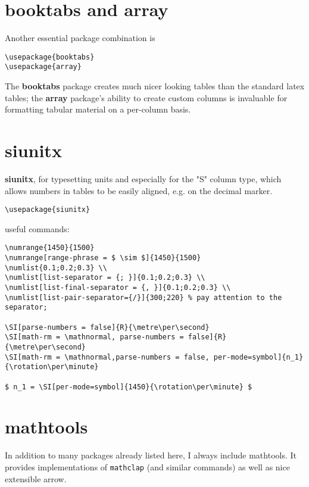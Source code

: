 \section{booktabs and array}
Another essential package combination is

\begin{lstlisting}[language={[LaTeX]TeX}]
\usepackage{booktabs}
\usepackage{array}
\end{lstlisting}

The \textbf{booktabs} package creates much nicer looking tables than the standard latex tables; the \textbf{array} package's ability to create custom columns is invaluable for formatting tabular material on a per-column basis.

\section{siunitx}
\textbf{siunitx}, for typesetting units and especially for the "S" column type, which allows numbers in tables to be easily aligned, e.g. on the decimal marker.

\begin{lstlisting}[language={[LaTeX]TeX}]
\usepackage{siunitx}
\end{lstlisting}

useful commands:

\begin{lstlisting}[language={[LaTeX]TeX}]
\numrange{1450}{1500}
\numrange[range-phrase = $ \sim $]{1450}{1500}
\numlist{0.1;0.2;0.3} \\
\numlist[list-separator = {; }]{0.1;0.2;0.3} \\
\numlist[list-final-separator = {, }]{0.1;0.2;0.3} \\
\numlist[list-pair-separator={/}]{300;220} % pay attention to the separator;

\SI[parse-numbers = false]{R}{\metre\per\second}
\SI[math-rm = \mathnormal, parse-numbers = false]{R}{\metre\per\second}
\SI[math-rm = \mathnormal,parse-numbers = false, per-mode=symbol]{n_1}{\rotation\per\minute}

$ n_1 = \SI[per-mode=symbol]{1450}{\rotation\per\minute} $
\end{lstlisting}

\section{mathtools}
In addition to many packages already listed here, I always include mathtools. It provides implementations of \lstinline[language={[LaTeX]TeX}]|mathclap| (and similar commands) as well as nice extensible arrow.

